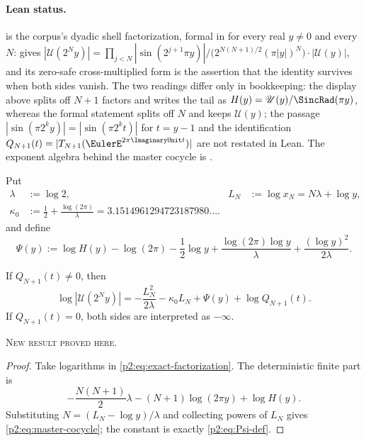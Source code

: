 \documentclass[11pt,oneside]{article}
\theoremstyle{definition}
\theoremstyle{remark}
\newcommand{\newresult}{\textcolor{newgreen}{\textsc{New result proved here.}}}
\begin{document}
\paragraph{Lean status.}
 is the corpus's dyadic shell factorization, formal in
 for every real \(y\ne0\) and every \(N\):
 gives
\(|\mathscr U(2^Ny)|=\prod_{j<N}|\sin(2^{j+1}\pi y)|\big/\bigl(2^{N(N+1)/2}(\pi|y|)^N\bigr)
\cdot|\mathscr U(y)|\), and its zero-safe cross-multiplied form
 is the assertion that the identity
survives when both sides vanish.  The two readings differ only in bookkeeping: the display
above splits off \(N+1\) factors and writes the tail as \(H(y)=\mathscr U(y)/\SincRad(\pi y)\),
whereas the formal statement splits off \(N\) and keeps \(\mathscr U(y)\); the passage
\(|\sin(\pi2^ky)|=|\sin(\pi2^kt)|\) for \(t=y-1\) and the identification
\(Q_{N+1}(t)=|T_{N+1}(\EulerE^{2\pi\ImaginaryUnit t})|\) are not restated in Lean.  The
exponent algebra behind the master cocycle is .

Put
\begin{equation}
 \begin{aligned}
 \lambda&:=\log2,
 &L_N&:=\log x_N=N\lambda+\log y,\\
 \kappa_0&:=\frac12+\frac{\log(2\pi)}{\lambda}
 =3.1514961294723187980\ldots.
 \end{aligned}
 \label{p2:eq:lambda-kappa0}
\end{equation}
and define
\begin{equation}
 \Psi(y):=\log H(y)-\log(2\pi)-\frac12\log y
 +\frac{\log(2\pi)\log y}{\lambda}
 +\frac{(\log y)^2}{2\lambda}.
 \label{p2:eq:Psi-def}
\end{equation}

\begin{corollary}\label{p2:cor:master-cocycle}
If $Q_{N+1}(t)\ne0$, then
\begin{equation}
 \boxed{
 \log|\mathscr U(2^Ny)|
 =-\frac{L_N^2}{2\lambda}-\kappa_0L_N
 +\Psi(y)+\log Q_{N+1}(t).}
 \label{p2:eq:master-cocycle}
\end{equation}
If $Q_{N+1}(t)=0$, both sides are interpreted as $-\infty$.

\smallskip\noindent\newresult
\end{corollary}

\begin{proof}
Take logarithms in \eqref{p2:eq:exact-factorization}. The deterministic finite part is
\[
 -\frac{N(N+1)}2\lambda-(N+1)\log(2\pi y)+\log H(y).
\]
Substituting $N=(L_N-\log y)/\lambda$ and collecting powers of $L_N$ gives
\eqref{p2:eq:master-cocycle}; the constant is exactly \eqref{p2:eq:Psi-def}.
\end{proof}
\end{document}
